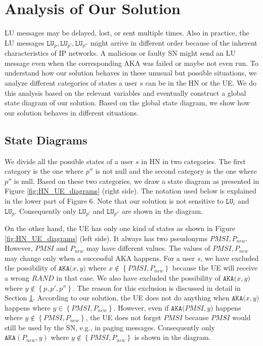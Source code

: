 \documentclass{llncs} %
\begin{document}
\section{Analysis of Our Solution} \label{sec:analysis}
LU messages may be delayed, lost, or sent multiple times. Also in practice, the LU messages $\texttt{LU}_p,\texttt{LU}_{p'},\texttt{LU}_{p''}$ might arrive in different order because of the inherent characteristics of IP networks. A malicious or faulty SN might send an LU message even when the corresponding AKA was failed or maybe not even run. To understand how our solution behaves in these unusual but possible situations, we analyze different categories of states a user $s$ can be in the HN or the UE. We do this analysis based on the relevant variables and eventually construct a global state diagram of our solution. Based on the global state diagram, we show how our solution behaves in different situations.

\subsection{State Diagrams}
We divide all the possible states of a user $s$ in HN in two categories. The first category is the one where $p''$ is not null and the second category is the one where $p''$ is null. Based on these two categories, we draw a state diagram as presented in Figure \ref{fig:HN_UE_diagrams} (right side). The notation used below is explained in the lower part of Figure 6. Note that our solution is not sensitive to $\texttt{LU}_{i}$ and $\texttt{LU}_{p}$. Consequently only $\texttt{LU}_{p'}$ and $\texttt{LU}_{p''}$ are shown in the diagram.

On the other hand, the UE has only one kind of states as shown in Figure \ref{fig:HN_UE_diagrams} (left side). It always has two pseudonyms $PMSI, P_{new}$. However, $PMSI$ and $P_{new}$ may have different values. The values of $PMSI,P_{new}$ may change only when a successful AKA happens. For a user $s$, we have excluded the possibility of  $\texttt{AKA($x,y$)}$ where $x \notin \left\lbrace PMSI,P_{new} \right\rbrace$ because the UE will receive a wrong $RAND$ in that case. We also have excluded the possibility of $\texttt{AKA($x,y$)}$ where $y \notin \left\lbrace p,p',p'' \right\rbrace$. The reason for this exclusion is discussed in detail in Section \ref{sec:analysis}. According to our solution, the UE does not do anything when $\texttt{AKA($x,y$)}$ happens where $y \in \left\lbrace PMSI,P_{new} \right\rbrace$. However, even if $\texttt{AKA($PMSI,y$)}$ happens where $y \notin  \left\lbrace PMSI,P_{new} \right\rbrace$, the UE does not forget $PMSI$ because $PMSI$ would still be used by the SN, e.g., in paging messages. Consequently only $\texttt{AKA}(P_{new},y)$ where $y \notin  \left\lbrace PMSI,P_{new} \right\rbrace$ is shown in the diagram.
\end{document}

